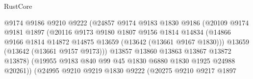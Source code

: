 \begin{lexlean}{RustCore}
\begin{coremodule}
                                    @9174
                                    @9186
                                    @9210
                                    @9222
                                    (@24857
                                      @9174
                                      @9183
                                      @1830
                                      @9186
                                      (@20109
                                        @9174
                                        @9181
                                        @1897
                                        (@20116
                                          @9173
                                          @9180
                                          @1807
                                          @9156
                                          @1814
                                          @14834
                                          (@14866
                                            @9166
                                            @1814
                                            @14872
                                            @14875
                                            @13659
                                            (@13642 (@13661 @9167 @1830)))
                                          @13659
                                          (@13642 (@13661 @9157 @9173)))
                                        @13857
                                        @13860
                                        @13863
                                        @13867
                                        @13872
                                        @13878)
                                      (@19955
                                        @9183
                                        @840
                                        @99
                                        @45
                                        @1830
                                        @6880
                                        @1830
                                        @1925
                                        @24988
                                        @20261))
                                    (@24995
                                      @9210
                                      @9219
                                      @1830
                                      @9222
                                      (@20275
                                        @9210
                                        @9217
                                        @1897

\end{coremodule}
\end{lexlean}
